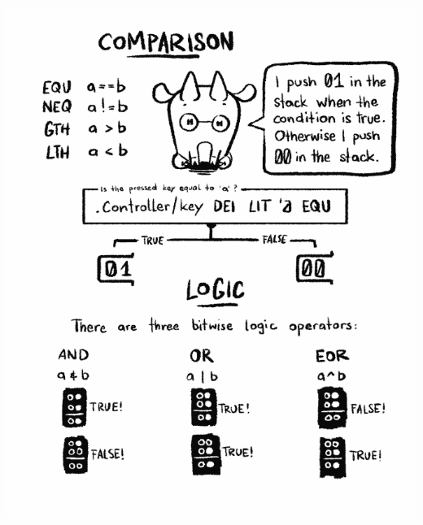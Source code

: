 \documentclass[paperheight=4.25in,paperwidth=2.75in,20pt]{article}
\begin{document}
  \includegraphics[width=1.0\paperwidth]{images/14_comparison-680.png}

  \newpage
  \thispagestyle{empty}
  \mbox{}
  \newpage
\end{document}
